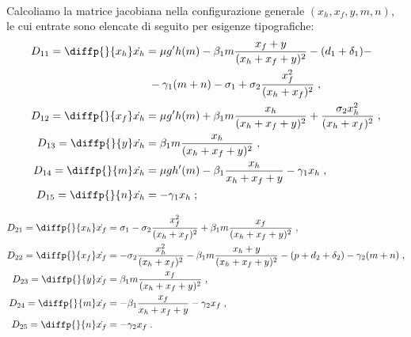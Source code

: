 \paragraph{}
Calcoliamo la matrice jacobiana nella configurazione generale $(x_h, x_f, y, m, n)$,
le cui entrate sono elencate di seguito per esigenze tipografiche:
\begin{equation}
\begin{split} %
D_{11} = \diffp{}{{x_h}} \dot{x_h} &=
    \mu g' h(m) - \beta_1 m \frac{x_f + y}{(x_h+x_f+y)^2} - (d_1 +\delta_1) - \\
    &~ - \gamma_1 (m+n) - \sigma_1 + \sigma_2 \frac{x_f^2}{(x_h+x_f)^2} \; , \\
D_{12} = \diffp{}{{x_f}} \dot{x_h} &= \mu g' h(m) + \beta_1 m \frac{x_h}{(x_h+x_f+y)^2} +
    \frac{\sigma_2 x_h^2}{(x_h+x_f)^2} \; , \\
D_{13} = \diffp{}{{y}} \dot{x_h} &= \beta_1 m \frac{x_h}{(x_h+x_f+y)^2} \; , \\
D_{14} = \diffp{}{m} \dot{x_h} &= \mu g h'(m) - \beta_1 \frac{x_h}{x_h+x_f+y} - \gamma_1 x_h \; , \\
D_{15} = \diffp{}{n} \dot{x_h} &= -\gamma_1 x_h \; ;
\end{split}
\end{equation}

\begin{equation} %
\begin{split}
D_{21} = \diffp{}{{x_h}} \dot{x_f} &= \sigma_1 - \sigma_2 \frac{x_f^2}{(x_h+x_f)^2} +
    \beta_1 m \frac{x_f}{(x_h+x_f+y)^2} \; , \\
D_{22} = \diffp{}{{x_f}} \dot{x_f} &= -\sigma_2 \frac{x_h^2}{(x_h+x_f)^2} - \beta_1 m \frac{x_h+y}{(x_h+x_f+y)^2}
    - (p + d_2 + \delta_2) - \gamma_2 (m+n) \; , \\
D_{23} = \diffp{}{y} \dot{x_f} &= \beta_1 m \frac{x_f}{(x_h+x_f+y)^2} \; , \\
D_{24} = \diffp{}{m} \dot{x_f} &= -\beta_1 \frac{x_f}{x_h+x_f+y} - \gamma_2 x_f \; , \\
D_{25} = \diffp{}{n} \dot{x_f} &= -\gamma_2 x_f \; .
\end{split}
\end{equation}

